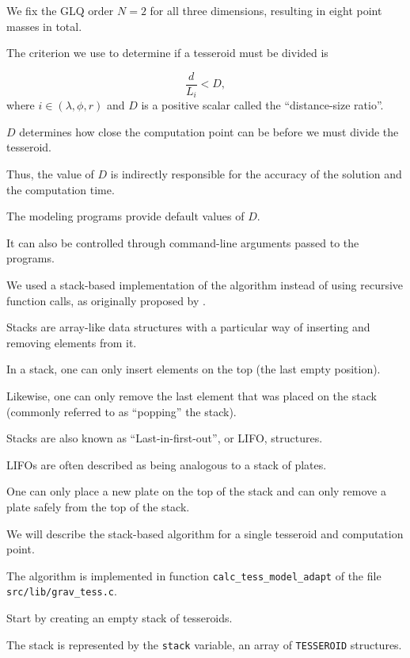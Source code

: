 \documentclass[paper,twocolumn]{geophysics}
\begin{document}
We fix the GLQ order $N=2$ for all three dimensions, resulting in eight point
masses in total.

The criterion we use to determine if a tesseroid must be divided is

\begin{equation}
    \frac{d}{L_i} < D,
    \label{eq:condition}
\end{equation}
\noindent
where $i \in (\lambda, \phi, r)$
and $D$ is a positive scalar called the ``distance-size ratio''.

$D$ determines how close the
computation point can be before we must divide the tesseroid.

Thus, the value of $D$ is indirectly responsible for
the accuracy of the solution and the computation time.

The modeling programs provide default values of $D$.

It can also be controlled through command-line arguments passed to the
programs.



We used a stack-based implementation of the algorithm instead of using
recursive function calls, as originally proposed by \citet{Li2011}.

Stacks are array-like data structures with a particular way of inserting and
removing elements from it.

In a stack, one can only insert elements on the top (the last empty position).

Likewise,
one can only remove the last element that was placed on the stack
(commonly referred to as ``popping'' the stack).

Stacks are also known as ``Last-in-first-out'', or LIFO, structures.

LIFOs are often described as being analogous to a stack of plates.

One can only place a new plate on the top of the stack and
can only remove a plate safely from the top of the stack.


We will describe the stack-based algorithm for a single tesseroid and
computation point.

The algorithm is implemented in function \texttt{calc\_tess\_model\_adapt}
of the file \texttt{src/lib/grav\_tess.c}.


Start by creating an empty stack of tesseroids.

The  stack is represented by the \texttt{stack} variable,
an array of \texttt{TESSEROID} structures.
\end{document}
